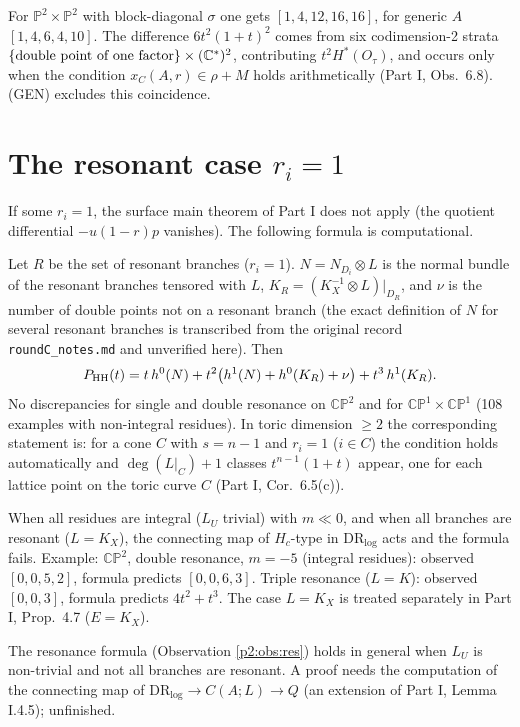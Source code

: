 \begin{obs}\label{p2:obs:gen}
For $\mathbb{P}^2\times\mathbb{P}^2$ with block-diagonal $\sigma$ one gets $[1,4,12,16,16]$, for generic $A$ $[1,4,6,4,10]$. The difference $6t^2(1+t)^2$ comes from six codimension-2 strata $\{\text{double point of one factor}\}\times(\mathbb C^*)^2$, contributing $t^2H^*(O_\tau)$, and occurs only when the condition $x_C(A,r)\in\rho+M$ holds arithmetically (Part I, Obs.\ 6.8). (GEN) excludes this coincidence.
\end{obs}

\section{The resonant case $r_i=1$}\label{p2:sec:res}
If some $r_i=1$, the surface main theorem of Part I does not apply (the quotient differential $-u(1-r)p$ vanishes). The following formula is computational.

\begin{obs}\label{p2:obs:res}
Let $R$ be the set of resonant branches ($r_i=1$). $N=N_{D_i}\otimes L$ is the normal bundle of the resonant branches tensored with $L$, $K_R=(K_X^{-1}\otimes L)|_{D_R}$, and $\nu$ is the number of double points not on a resonant branch (the exact definition of $N$ for several resonant branches is transcribed from the original record \texttt{roundC\_notes.md} and unverified here\tQ). Then
\[P_{\mathrm{HH}}(t)=t\,h^0(N)+t^2\bigl(h^1(N)+h^0(K_R)+\nu\bigr)+t^3\,h^1(K_R).\]
No discrepancies for single and double resonance on $\mathbb{CP}^2$ and for $\mathbb{CP}^1\times\mathbb{CP}^1$ (108 examples with non-integral residues). In toric dimension $\ge2$ the corresponding statement is: for a cone $C$ with $s=n-1$ and $r_i=1$ ($i\in C$) the condition holds automatically and $\deg(L|_C)+1$ classes $t^{n-1}(1+t)$ appear, one for each lattice point on the toric curve $C$ (Part I, Cor.\ 6.5(c)).
\end{obs}
\begin{obs}
When all residues are integral ($L_U$ trivial) with $m\ll0$, and when all branches are resonant ($L=K_X$), the connecting map of $H_c$-type in $\mathrm{DR}_{\log}$ acts and the formula fails. Example: $\mathbb{CP}^2$, double resonance, $m=-5$ (integral residues): observed $[0,0,5,2]$, formula predicts $[0,0,6,3]$. Triple resonance ($L=K$): observed $[0,0,3]$, formula predicts $4t^2+t^3$. The case $L=K_X$ is treated separately in Part I, Prop.\ 4.7 ($E=K_X$).
\end{obs}
\begin{conj}\tK
The resonance formula (Observation \ref{p2:obs:res}) holds in general when $L_U$ is non-trivial and not all branches are resonant. A proof needs the computation of the connecting map of $\mathrm{DR}_{\log}\to C(A;L)\to Q$ (an extension of Part I, Lemma I.4.5); unfinished.
\end{conj}

